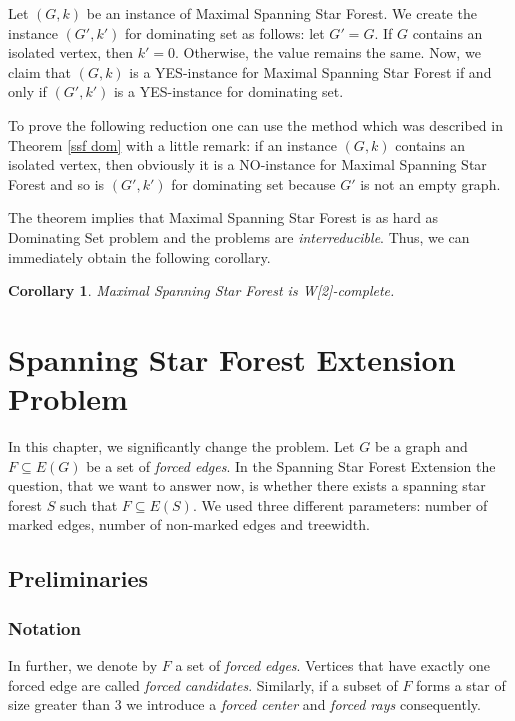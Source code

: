 \documentclass[en]{pracamgr}
\newtheorem{corollary}{Corollary}
\newenvironment{sproof}{%
	\renewcommand{\proofname}{Proof (sketch).}\proof}{\endproof}
\newcommand{\ssf}{spanning star forest}
\newcommand{\mssfp}{{\sc Maximal Spanning Star Forest}}
\newcommand{\ssfep}{{\sc Spanning Star Forest Extension}}
\newcommand{\domset}{dominating set}
\newcommand{\domsetp}{{\sc Dominating Set} problem}
\begin{document}
\begin{sproof}
	Let $(G,k)$ be an instance of \mssfp{}. We create the instance $(G',k')$ for \domset{} as follows: let $G'=G$. If $G$ contains an isolated vertex, then $k'=0$. Otherwise, the value remains the same. Now, we claim that $(G,k)$ is a YES-instance for \mssfp{} if and only if $(G',k')$ is a YES-instance for \domset.
	
	To prove the following reduction one can use the method which was described in Theorem \ref{ssf dom} with a little remark: if an instance $(G,k)$ contains an isolated vertex, then obviously it is a NO-instance for \mssfp{} and so is $(G',k')$ for \domset{} because $G'$ is not an empty graph.
\end{sproof}

The theorem implies that \mssfp{} is as hard as \domsetp{} and the problems are \emph{interreducible}. Thus, we can immediately obtain the following corollary.

\begin{corollary}
	\mssfp{} is {\normalfont W[2]-complete}.
\end{corollary}

\chapter{Spanning Star Forest Extension Problem}

In this chapter, we significantly change the problem. Let $G$ be a graph and $F \subseteq E(G)$ be a set of \emph{forced edges}. In the \ssfep{} the question, that we want to answer now, is whether there exists a \ssf{} $S$ such that $F \subseteq E(S)$. We used three different parameters: number of marked edges, number of non-marked edges and treewidth. 

\section{Preliminaries}

\subsection{Notation}

In further, we denote by $F$ a set of \emph{forced edges}. Vertices that have exactly one forced edge are called \emph{forced candidates}. Similarly, if a subset of $F$ forms a star of size greater than $3$ we introduce a \emph{forced center} and \emph{forced rays} consequently.
\end{document}
